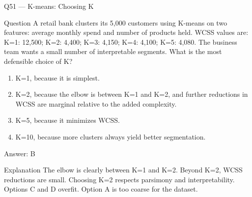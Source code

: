 \documentclass[aspectratio=169,8pt]{beamer}
\begin{document}
	\begin{frame}{Q51 --- K-means: Choosing K}
		\begin{block}{Question}
			A retail bank clusters its 5,000 customers using K-means on two features: average monthly spend and number of products held. WCSS values are: K=1: 12,500; K=2: 4,400; K=3: 4,150; K=4: 4,100; K=5: 4,080. The business team wants a small number of interpretable segments. What is the most defensible choice of K?
		\end{block}
		\begin{enumerate}
			\item K=1, because it is simplest.
			\item K=2, because the elbow is between K=1 and K=2, and further reductions in WCSS are marginal relative to the added complexity.
			\item K=5, because it minimizes WCSS.
			\item K=10, because more clusters always yield better segmentation.
		\end{enumerate}
		\begin{exampleblock}{Answer: B}\end{exampleblock}
		\begin{block}{Explanation}
			The elbow is clearly between K=1 and K=2. Beyond K=2, WCSS reductions are small. Choosing K=2 respects parsimony and interpretability. Options C and D overfit. Option A is too coarse for the dataset.
		\end{block}
	\end{frame}
	
\end{document}
